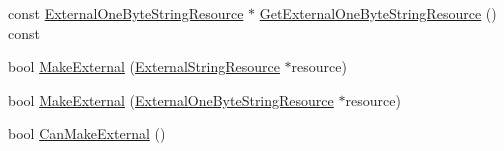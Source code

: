 \begin{DoxyCompactItemize}
\item 
const \mbox{\hyperlink{classv8_1_1String_1_1ExternalOneByteStringResource}{External\+One\+Byte\+String\+Resource}} $\ast$ \mbox{\hyperlink{classv8_1_1String_af93d92ca10a216be472d1b7c20550f76}{Get\+External\+One\+Byte\+String\+Resource}} () const
\item 
bool \mbox{\hyperlink{classv8_1_1String_a5efd1eba40c1fa8a6aae2c4a175a63be}{Make\+External}} (\mbox{\hyperlink{classv8_1_1String_1_1ExternalStringResource}{External\+String\+Resource}} $\ast$resource)
\item 
bool \mbox{\hyperlink{classv8_1_1String_a607d632c720eec5133649f522aefa944}{Make\+External}} (\mbox{\hyperlink{classv8_1_1String_1_1ExternalOneByteStringResource}{External\+One\+Byte\+String\+Resource}} $\ast$resource)
\item 
bool \mbox{\hyperlink{classv8_1_1String_a0fe076838af046506ffebbfadcde812a}{Can\+Make\+External}} ()
\end{DoxyCompactItemize}
